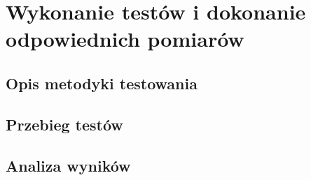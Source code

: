 \chapter{Wykonanie testów i dokonanie odpowiednich pomiarów}
\section{Opis metodyki testowania}
\section{Przebieg testów}
\section{Analiza wyników}